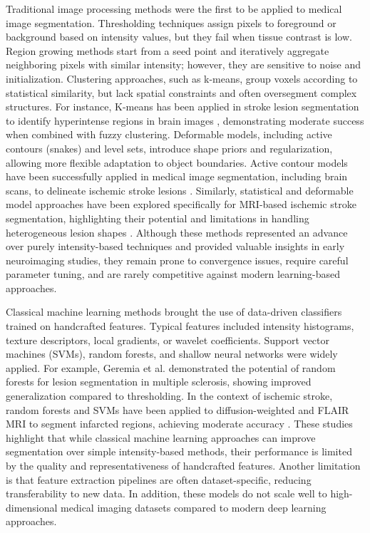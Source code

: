 \documentclass[12pt]{article}
\begin{document}
Traditional image processing methods were the first to be applied to medical image segmentation. Thresholding techniques assign pixels to foreground or background based on intensity values, but they fail when tissue contrast is low. Region growing methods start from a seed point and iteratively aggregate neighboring pixels with similar intensity; however, they are sensitive to noise and initialization. Clustering approaches, such as k-means, group voxels according to statistical similarity, but lack spatial constraints and often oversegment complex structures. For instance, K-means has been applied in stroke lesion segmentation to identify hyperintense regions in brain images \cite{inproceedings}, demonstrating moderate success when combined with fuzzy clustering. Deformable models, including active contours (snakes) and level sets, introduce shape priors and regularization, allowing more flexible adaptation to object boundaries. Active contour models have been successfully applied in medical image segmentation, including brain scans, to delineate ischemic stroke lesions \cite{qianActiveContourModel2013}. Similarly, statistical and deformable model approaches have been explored specifically for MRI-based ischemic stroke segmentation, highlighting their potential and limitations in handling heterogeneous lesion shapes \cite{steinStatisticalDeformableModel2001}. Although these methods represented an advance over purely intensity-based techniques and provided valuable insights in early neuroimaging studies, they remain prone to convergence issues, require careful parameter tuning, and are rarely competitive against modern learning-based approaches.

Classical machine learning methods brought the use of data-driven classifiers trained on handcrafted features. Typical features included intensity histograms, texture descriptors, local gradients, or wavelet coefficients. Support vector machines (SVMs), random forests, and shallow neural networks were widely applied. For example, Geremia et al. \cite{geremiaSpatialDecisionForests2011} demonstrated the potential of random forests for lesion segmentation in multiple sclerosis, showing improved generalization compared to thresholding. In the context of ischemic stroke, random forests and SVMs have been applied to diffusion-weighted and FLAIR MRI to segment infarcted regions, achieving moderate accuracy \cite{inproceedings}. These studies highlight that while classical machine learning approaches can improve segmentation over simple intensity-based methods, their performance is limited by the quality and representativeness of handcrafted features. Another limitation is that feature extraction pipelines are often dataset-specific, reducing transferability to new data. In addition, these models do not scale well to high-dimensional medical imaging datasets compared to modern deep learning approaches.
\end{document}
